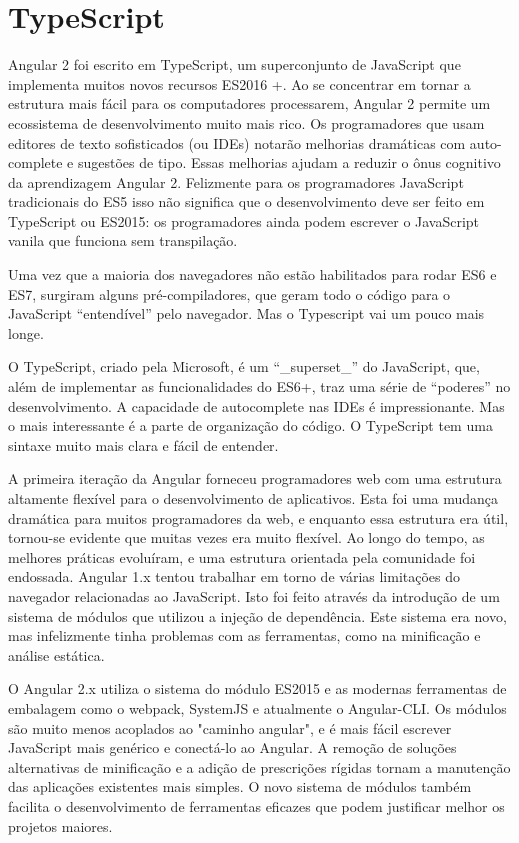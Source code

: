 \documentclass[12pt]{article}
\begin{document}
\section{TypeScript} \label{sec:firstpage}

Angular 2 foi escrito em TypeScript, um superconjunto de JavaScript que implementa muitos novos recursos ES2016 +.
Ao se concentrar em tornar a estrutura mais fácil para os computadores processarem, Angular 2 permite um ecossistema de desenvolvimento muito mais rico. Os programadores que usam editores de texto sofisticados (ou IDEs) notarão melhorias dramáticas com auto-complete e sugestões de tipo. Essas melhorias ajudam a reduzir o ônus cognitivo da aprendizagem Angular 2. Felizmente para os programadores JavaScript tradicionais do ES5 isso não significa que o desenvolvimento deve ser feito em TypeScript ou ES2015: os programadores ainda podem escrever o JavaScript vanila que funciona sem transpilação.

Uma vez que a maioria dos navegadores não estão habilitados para rodar ES6 e ES7, surgiram alguns pré-compiladores, que geram todo o código para o JavaScript “entendível” pelo navegador. Mas o Typescript vai um pouco mais longe.

O TypeScript, criado pela Microsoft, é um “\_superset\_” do JavaScript, que, além de implementar as funcionalidades do ES6+, traz uma série de “poderes” no desenvolvimento. A capacidade de autocomplete nas IDEs é impressionante. Mas o mais interessante é a parte de organização do código. O TypeScript tem uma sintaxe muito mais clara e fácil de entender.

A primeira iteração da Angular forneceu programadores web com uma estrutura altamente flexível para o desenvolvimento de aplicativos. Esta foi uma mudança dramática para muitos programadores da web, e enquanto essa estrutura era útil, tornou-se evidente que muitas vezes era muito flexível. Ao longo do tempo, as melhores práticas evoluíram, e uma estrutura orientada pela comunidade foi endossada.
Angular 1.x tentou trabalhar em torno de várias limitações do navegador relacionadas ao JavaScript. Isto foi feito através da introdução de um sistema de módulos que utilizou a injeção de dependência. Este sistema era novo, mas infelizmente tinha problemas com as ferramentas, como na minificação e análise estática.

O Angular 2.x utiliza o sistema do módulo ES2015 e as modernas ferramentas de embalagem como o webpack, SystemJS e atualmente o Angular-CLI. Os módulos são muito menos acoplados ao "caminho angular", e é mais fácil escrever JavaScript mais genérico e conectá-lo ao Angular. A remoção de soluções alternativas de minificação e a adição de prescrições rígidas tornam a manutenção das aplicações existentes mais simples. O novo sistema de módulos também facilita o desenvolvimento de ferramentas eficazes que podem justificar melhor os projetos maiores.\cite{bierman2014understanding}
\end{document}
